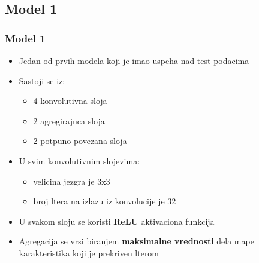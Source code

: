 \documentclass{beamer}
\begin{document}
\subsection{Model 1}
\begin{frame}
\frametitle{Model 1}

\begin{itemize}

\item Jedan od prvih modela koji je imao uspeha nad test podacima
\item Sastoji se iz:
\begin{itemize}
\item 4 konvolutivna sloja
\item 2 agregirajuca sloja
\item 2 potpuno povezana sloja
\end{itemize}

\item U svim konvolutivnim slojevima:
\begin{itemize}
\item velicina jezgra je 3x3
\item broj ltera na izlazu iz konvolucije je 32
\end{itemize}


\item U svakom sloju se koristi \textbf{ReLU} aktivaciona funkcija
\item Agregacija se vrsi biranjem \textbf{maksimalne vrednosti} dela mape karakteristika koji je prekriven lterom

\end{itemize}


\end{frame}
\end{document}

